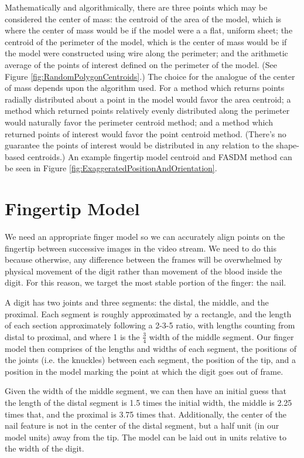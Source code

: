  Mathematically and algorithmically, there are three points which may be considered the center of mass: the centroid of the area of the model, which is where the center of mass would be if the model were a a flat, uniform sheet; the centroid of the perimeter of the model, which is the center of mass would be if the model were constructed using wire along the perimeter; and the arithmetic average of the points of interest defined on the perimeter of the model. (See Figure \ref{fig:RandomPolygonCentroids}.) The choice for the analogue of the center of mass depends upon the algorithm used. For a method which returns points radially distributed about a point in the model would favor the area centroid; a method which returned points relatively evenly distributed along the perimeter would naturally favor the perimeter centroid method; and a method which returned points of interest would favor the point centroid method. (There's no guarantee the points of interest would be distributed in any relation to the shape-based centroids.) An example fingertip model centroid and FASDM method can be seen in Figure \ref{fig:ExaggeratedPositionAndOrientation}.


\section{Fingertip Model}\label{sec:FingertipModel}

We need an appropriate finger model so we can accurately align points on the fingertip between successive images in the video stream. We need to do this because otherwise, any difference between the frames will be overwhelmed by physical movement of the digit rather than movement of the blood inside the digit. For this reason, we target the most stable portion of the finger: the nail.

A digit has two joints and three segments: the distal, the middle, and the proximal. Each segment is roughly approximated by a rectangle, and the length of each section approximately following a 2-3-5 ratio, with lengths counting from distal to proximal, and where 1 is the $\frac{3}{4}$ width of the middle segment. Our finger model then comprises of the lengths and widths of each segment, the positions of the joints (i.e. {\tiny {\tiny }}the knuckles) between each segment, the position of the tip, and a position in the model marking the point at which the digit goes out of frame.

Given the width of the middle segment, we can then have an initial guess that the length of the distal segment is 1.5 times the initial width, the middle is 2.25 times that, and the proximal is 3.75 times that. Additionally, the center of the nail feature is not in the center of the distal segment, but a half unit (in our model units) away from the tip. The model can be laid out in units relative to the width of the digit.

